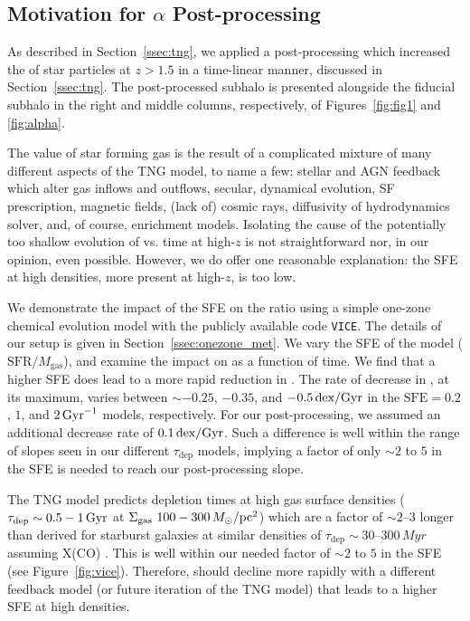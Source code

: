 \subsection{Motivation for $\alpha$ Post-processing}\label{ssec:sfe}
As described in Section~\ref{ssec:tng}, we applied a post-processing which increased the \MgFe{} of star particles at $z>1.5$ in a time-linear manner, discussed in Section~\ref{ssec:tng}. The post-processed subhalo is presented alongside the fiducial subhalo in the right and middle columns, respectively, of Figures~\ref{fig:fig1} and \ref{fig:alpha}.

The \MgFe{} value of star forming gas is the result of a complicated mixture of many different aspects of the TNG model, to name a few: stellar and AGN feedback which alter gas inflows and outflows, secular, dynamical evolution, SF prescription, magnetic fields, (lack of) cosmic rays, diffusivity of hydrodynamics solver, and, of course, enrichment models. Isolating the cause of the potentially too shallow evolution of \MgFe{} vs. time at high-$z$ is not straightforward nor, in our opinion, even possible. However, we do offer one reasonable explanation: the SFE at high densities, more present at high-$z$, is too low.

We demonstrate the impact of the SFE on the \alphaFe{} ratio using a simple one-zone chemical evolution model with the publicly available code \texttt{VICE}. The details of our setup is given in Section~\ref{ssec:onezone_met}. We vary the SFE of the model ($\textrm{SFR}/M_{\textrm{gas}}$), and examine the impact on \MgFe{} as a function of time. We find that a higher SFE does lead to a more rapid reduction in \MgFe{}. The rate of decrease in \MgFe{}, at its maximum, varies between $\sim-0.25$, $-0.35$, and $-0.5\,\textrm{dex}/\textrm{Gyr}$ in the $\textrm{SFE}=0.2$, $1$, and $2\,\textrm{Gyr}^{-1}$ models, respectively. For our post-processing, we assumed an additional decrease rate of $0.1\,\textrm{dex}/\textrm{Gyr}$. Such a difference is well within the range of \MgFe{} slopes seen in our different $\tau_{\textrm{dep}}$ models, implying a factor of only $\sim2$ to $5$ in the SFE is needed to reach our post-processing slope.

The TNG model predicts depletion times at high gas surface densities ($\tau_{\textrm{dep}}\sim0.5-1\,\textrm{Gyr}$ at $\Sigma_{\textrm{gas}} ~ 100-300\,M_{\odot}/\textrm{pc}^2$) which are a factor of $\sim2$--$3$ longer than derived for starburst galaxies at similar densities of $\tau_{\textrm{dep}}\sim30$--$300\,Myr$ assuming \citet{2013ARA&A..51..207B} X(CO) \citep[see][]{2019ApJ...872...16D,2021ApJ...908...61K,2024arXiv240909121H}. This is well within our needed factor of $\sim2$ to $5$ in the SFE (see Figure~\ref{fig:vice}). Therefore, \MgFe{} should decline more rapidly with a different feedback model (or future iteration of the TNG model) that leads to a higher SFE at high densities.

